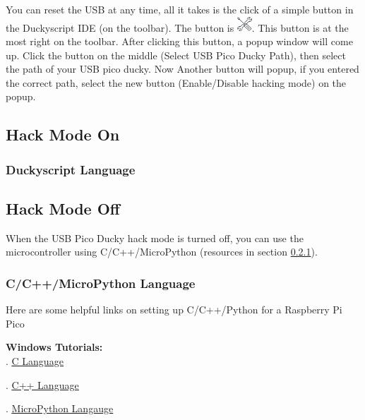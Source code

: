 \documentclass[a4paper,12pt]{article}
\begin{document}
You can reset the USB at any time, all it takes is the click of a simple button in the Duckyscript IDE (on the toolbar). The button is \includegraphics[width=5.5mm]{pictures/setup.png}. This button is at the most right on the toolbar. After clicking this button, a popup window will come up. Click the button on the middle (Select USB Pico Ducky Path), then select the path of your USB pico ducky. Now Another button will popup, if you entered the correct path, select the new button (Enable/Disable hacking mode) on the popup.

\subsection{Hack Mode On}\label{hack_mode_on}

\subsubsection{Duckyscript Language}

\subsection{Hack Mode Off}\label{hack_mode_off}

When the USB Pico Ducky hack mode is turned off, you can use the microcontroller using C/C++/MicroPython (resources in section \ref{cc_lang}).


\subsubsection{C/C++/MicroPython Language}\label{cc_lang}

Here are some helpful links on setting up C/C++/Python for a Raspberry Pi Pico

\textbf{Windows Tutorials:}\\
\indent{}. \underline{\href{https://www.raspberrypi.com/news/raspberry-pi-pico-windows-installer/}{C Language}}

\indent{}. \underline{\href{https://www.raspberrypi.com/news/raspberry-pi-pico-windows-installer/}{C++ Language}}

\indent{}. \underline{\href{https://how2electronics.com/raspberry-pi-pico-getting-started-tutorial-with-micropython/}{MicroPython Langauge}}\\
\end{document}
